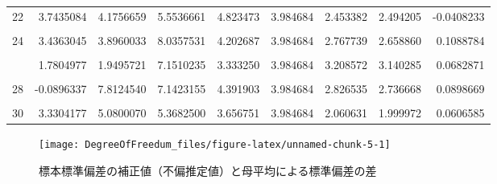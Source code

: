\documentclass[]{tufte-handout}
\begin{document}
\begin{table}
{\begin{tabular}[t]{rrrrrrrrr}
22 & 3.7435084 & 4.1756659 & 5.5536661 & 4.823473 & 3.984684 & 2.453382 & 2.494205 & -0.0408233\\
\cellcolor{gray!6}{23} & \cellcolor{gray!6}{3.8786155} & \cellcolor{gray!6}{7.1202550} & \cellcolor{gray!6}{7.2847092} & \cellcolor{gray!6}{6.491526} & \cellcolor{gray!6}{3.984684} & \cellcolor{gray!6}{2.100989} & \cellcolor{gray!6}{3.214120} & \cellcolor{gray!6}{-1.1131312}\\
24 & 3.4363045 & 3.8960033 & 8.0357531 & 4.202687 & 3.984684 & 2.767739 & 2.658860 & 0.1088784\\
\cellcolor{gray!6}{25} & \cellcolor{gray!6}{-0.9928191} & \cellcolor{gray!6}{3.6903414} & \cellcolor{gray!6}{1.8810476} & \cellcolor{gray!6}{3.664850} & \cellcolor{gray!6}{3.984684} & \cellcolor{gray!6}{2.794451} & \cellcolor{gray!6}{2.694533} & \cellcolor{gray!6}{0.0999188}\\
\addlinespace
26 & 1.7804977 & 1.9495721 & 7.1510235 & 3.333250 & 3.984684 & 3.208572 & 3.140285 & 0.0682871\\
\cellcolor{gray!6}{27} & \cellcolor{gray!6}{5.4760104} & \cellcolor{gray!6}{3.8982844} & \cellcolor{gray!6}{6.7556193} & \cellcolor{gray!6}{4.290551} & \cellcolor{gray!6}{3.984684} & \cellcolor{gray!6}{1.940303} & \cellcolor{gray!6}{1.882711} & \cellcolor{gray!6}{0.0575924}\\
28 & -0.0896337 & 7.8124540 & 7.1423155 & 4.391903 & 3.984684 & 2.826535 & 2.736668 & 0.0898669\\
\cellcolor{gray!6}{29} & \cellcolor{gray!6}{8.5725004} & \cellcolor{gray!6}{3.8306904} & \cellcolor{gray!6}{1.6058561} & \cellcolor{gray!6}{3.434627} & \cellcolor{gray!6}{3.984684} & \cellcolor{gray!6}{2.885195} & \cellcolor{gray!6}{2.816597} & \cellcolor{gray!6}{0.0685984}\\
30 & 3.3304177 & 5.0800070 & 5.3682500 & 3.656751 & 3.984684 & 2.060631 & 1.999972 & 0.0606585\\
\bottomrule
\end{tabular}}
\end{table}

\begin{figure}

{\centering \texttt{[image: DegreeOfFreedum\_files/figure-latex/unnamed-chunk-5-1]} 

}

\caption[標本標準偏差の補正値（不偏推定値）と母平均による標準偏差の差]{標本標準偏差の補正値（不偏推定値）と母平均による標準偏差の差}\label{fig:unnamed-chunk-5}
\end{figure}
\end{document}
